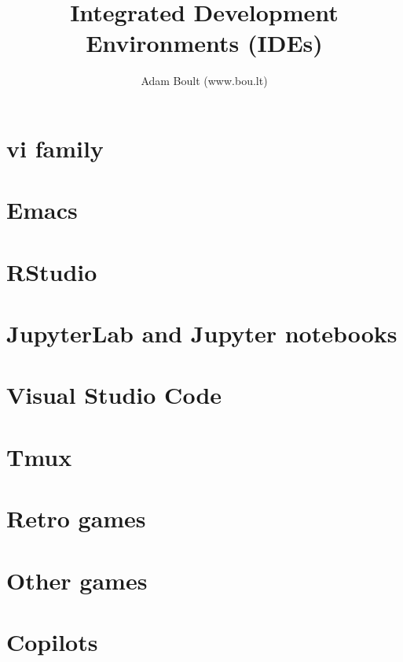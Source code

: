 \documentclass[oneside]{book}
\begin{document}
\author{Adam Boult (www.bou.lt)}
\title{Integrated Development Environments (IDEs)}
\maketitle

\setcounter{tocdepth}{0}
\tableofcontents



\part{vi family}



\part{Emacs}


\part{RStudio}


\part{JupyterLab and Jupyter notebooks}


\part{Visual Studio Code}


\part{Tmux}


\part{Retro games}



\part{Other games}






\part{Copilots}

\end{document}
